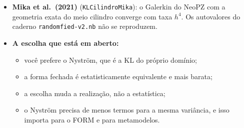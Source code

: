 \begin{itemize}
    separável. O \texttt{gs.Exponential} anisotrópico usa a distância euclidiana escalada, que é outro núcleo.
  \item \textbf{Mika et al.\ (2021)} (\texttt{KLCilindroMika}): o Galerkin do NeoPZ com a geometria exata do meio
    cilindro converge com taxa $h^4$. Os autovalores do caderno \texttt{randomfied-v2.nb} não se reproduzem.
  \item \textbf{A escolha que está em aberto:}
    \begin{itemize}
      \item você prefere o Nyström, que é a KL do próprio domínio;
      \item a forma fechada é estatisticamente equivalente e mais barata;
      \item a escolha muda a realização, não a estatística;
      \item o Nyström precisa de menos termos para a mesma variância, e isso importa para o FORM e para metamodelos.
    \end{itemize}
\end{itemize}
